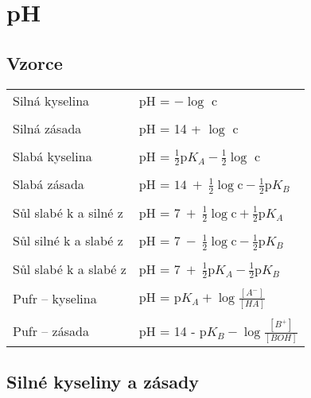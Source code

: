 \section{pH}

\subsection{Vzorce}

\begin{tabular}{ll}
	Silná kyselina & pH = $-\log$ c \\
	& \\
	Silná zásada & pH = 14 + $\log$ c \\
	& \\
	Slabá kyselina & pH = $\frac{1}{2}\textrm{p}K_A-\frac{1}{2}\log$ c \\
	& \\
	Slabá zásada & pH = $14\ +\ \frac{1}{2}\log\textrm{c} - \frac{1}{2}\textrm{p}K_B$ \\
	& \\
	Sůl slabé k a silné z & pH = $7\ +\ \frac{1}{2}\log\textrm{c} + \frac{1}{2}\textrm{p}K_A$ \\
	& \\
	Sůl silné k a slabé z & pH = $7\ -\ \frac{1}{2}\log\textrm{c} - \frac{1}{2}\textrm{p}K_B$ \\
	& \\
	Sůl slabé k a slabé z & pH = $7\ +\ \frac{1}{2}\textrm{p}K_A - \frac{1}{2}\textrm{p}K_B$ \\
	& \\
	Pufr -- kyselina & pH = $\textrm{p}K_A + \log \frac{[A^-]}{[HA]}$ \\
	& \\
	Pufr -- zásada & pH = 14 - $\textrm{p}K_B - \log \frac{[B^+]}{[BOH]}$ \\
\end{tabular}
\pagebreak

\subsection{Silné kyseliny a zásady}


\clearpage